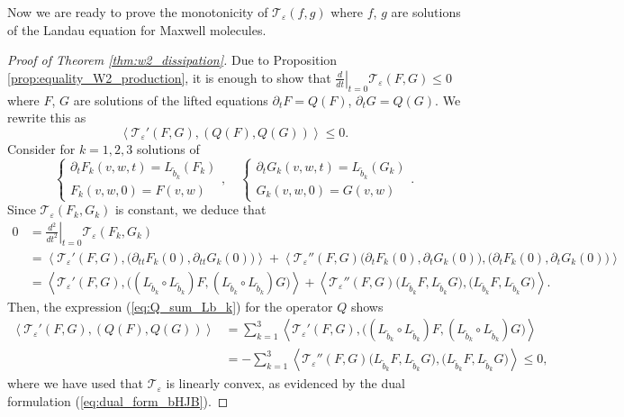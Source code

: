 \documentclass[11pt]{amsart}
\numberwithin{equation}{section}
\begin{document}
Now we are ready to prove the monotonicity of $\mathcal T_\varepsilon(f,g)$ where $f$, $g$ are solutions of the Landau equation for Maxwell molecules.
%
\begin{proof}[Proof of Theorem \ref{thm:w2_dissipation}]
  Due to Proposition \ref{prop:equality_W2_production}, it is enough to show that ${\left.\frac{d}{dt}\right|_{t=0}\mathcal T_\varepsilon(F,G)\leq0}$ where $F$, $G$ are solutions of the lifted equations $\partial_{t}F=Q(F)$, $\partial_tG=Q(G)$. We rewrite this as
  \begin{equation*}
    \left\langle \mathcal T_\varepsilon'(F,G), (Q(F),Q(G)) \right\rangle \leq 0.
  \end{equation*}
  Consider for $k=1,2,3$ solutions of
  \begin{equation*}
    \begin{cases}
      \partial_{t}F_{k}(v,w,t)=L_{\tilde{b}_{k}}(F_k)\\
      F_{k}(v,w,0)=F(v,w)
    \end{cases},\quad
    \begin{cases}
      \partial_{t}G_{k}(v,w,t)=L_{\tilde{b}_{k}}(G_k)\\
      G_{k}(v,w,0)=G(v,w)
    \end{cases}.
  \end{equation*}
  Since $\mathcal T_\varepsilon(F_{k},G_k)$ is constant, we deduce that
  \begin{align*}
    0 & =\left.\frac{d^{2}}{dt^{2}}\right|_{t=0}\mathcal T_\varepsilon(F_{k},G_k) \\
    & =\left\langle \mathcal T_\varepsilon'(F,G),\big(\partial_{tt}F_{k}(0),\partial_{tt}G_{k}(0)\big)\right\rangle +
    \left\langle \mathcal T_\varepsilon''(F,G)\big(\partial_{t}F_{k}(0),\partial_{t}G_{k}(0)\big),\big(\partial_{t}F_{k}(0),\partial_{t}G_{k}(0)\big)\right\rangle \\
    & =\left\langle \mathcal T_\varepsilon'(F,G),\big((L_{\tilde{b}_{k}}\circ L_{\tilde{b}_{k}})F,
    (L_{\tilde{b}_{k}}\circ L_{\tilde{b}_{k}})G\big)\right\rangle +
    \left\langle \mathcal T_\varepsilon''(F,G)\big(L_{\tilde{b}_{k}}F,L_{\tilde{b}_{k}}G\big),\big(L_{\tilde{b}_{k}}F,L_{\tilde{b}_{k}}G\big)\right\rangle.
  \end{align*}
  Then, the expression (\ref{eq:Q_sum_Lb_k}) for the operator $Q$ shows
  \begin{align}
    \left\langle \mathcal T_\varepsilon'(F,G), (Q(F),Q(G)) \right\rangle  &
     =\sum_{k=1}^{3}\left\langle \mathcal T_\varepsilon'(F,G),\big((L_{\tilde{b}_{k}}\circ L_{\tilde{b}_{k}})F,(L_{\tilde{b}_{k}}\circ L_{\tilde{b}_{k}})G\big)\right\rangle  \nonumber\\
    & =-\sum_{k=1}^{3}\left\langle \mathcal T_\varepsilon''(F,G)\big(L_{\tilde{b}_{k}}F,L_{\tilde{b}_{k}}G\big),\big(L_{\tilde{b}_{k}}F,L_{\tilde{b}_{k}}G\big)\right\rangle \leq 0, \label{form1}
  \end{align}
  where we have used that $\mathcal T_\varepsilon$ is linearly convex, as evidenced by the dual formulation (\ref{eq:dual_form_bHJB}). 
\end{proof}
\end{document}
